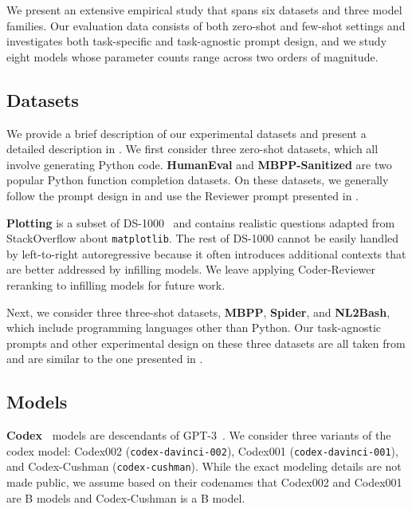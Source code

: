 \documentclass[nohyperref]{article}
\theoremstyle{plain}
\theoremstyle{definition}
\theoremstyle{remark}
\renewcommand{\paragraph}[1]{
     \textbf{#1} 
 }
\begin{document}
\label{sec:exp-setup}
We present an extensive empirical study that spans six datasets and three model families.
Our evaluation data consists of both zero-shot and few-shot settings and investigates both task-specific and task-agnostic prompt design, and we study eight models whose parameter counts range across two orders of magnitude.


\subsection{Datasets}
We provide a brief description of our experimental datasets and present a detailed description in .
We first consider three zero-shot datasets, which all involve generating Python code.
\textbf{HumanEval} and \textbf{MBPP-Sanitized} are two popular Python function completion datasets.
On these datasets, we generally follow the prompt design in \citet{codet} and use the Reviewer prompt presented in .
\paragraph{Plotting} is a subset of DS-1000~\citep{Lai2022DS1000} and contains  realistic questions adapted from StackOverflow about \texttt{matplotlib}. 
The rest of DS-1000 cannot be easily handled by left-to-right autoregressive because it often introduces additional contexts that are better addressed by infilling models.
We leave applying Coder-Reviewer reranking to infilling models for future work.



Next, we consider three three-shot datasets, \textbf{MBPP}, \textbf{Spider}, and \textbf{NL2Bash}, which include programming languages other than Python.
Our task-agnostic prompts and other experimental design on these three datasets are all taken from \citet{mbr} and are similar to the one presented in .


\subsection{Models}
\paragraph{Codex~\citep{codex}} models are descendants of GPT-3~\citep{gpt3}.
We consider three variants of the codex model: Codex002 (\texttt{codex-davinci-002}), Codex001 (\texttt{codex-davinci-001}), and Codex-Cushman (\texttt{codex-cushman}).
While the exact modeling details are not made public, we assume based on their codenames that Codex002 and Codex001 are B models and Codex-Cushman is a B model.
\end{document}
